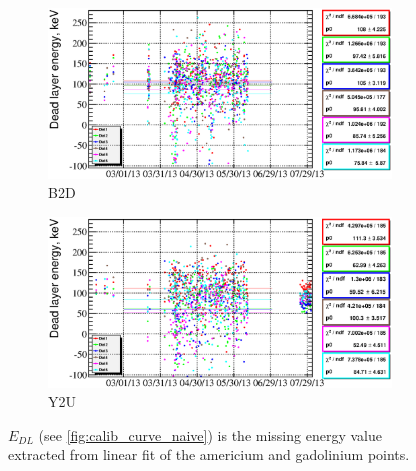 \documentclass[a4paper,12pt]{article}
\begin{document}
\newcommand\edllabellabel{$E_{DL}$ (see \cref{fig:calib_curve_naive}) is the missing
energy value extracted from linear fit of the americium and gadolinium points.}
\begin{figure}
\begin{subfigure}[b]{0.5\textwidth}
\includegraphics[width=\textwidth]{gfx/run13_alpha_study/B2D/c_chDeadLayerEnergy_by_day_B2D.eps}
\caption{B2D}
\end{subfigure}
%
\begin{subfigure}[b]{0.5\textwidth}
\includegraphics[width=\textwidth]{gfx/run13_alpha_study/Y2U/c_chDeadLayerEnergy_by_day_Y2U.eps}
\caption{Y2U}
\end{subfigure}
%
\caption{\edllabellabel{}}
\label{fig:e_dl}
\end{figure}
\end{document}
